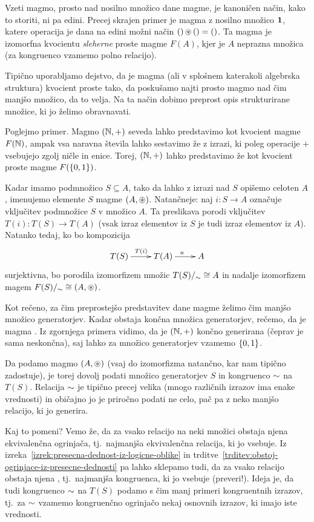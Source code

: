 Vzeti magmo, prosto nad nosilno množico dane magme, je kanoničen način, kako to storiti, ni pa edini. Precej skrajen primer je magma z nosilno množico $\mathtt{\mathbf{1}}$, katere operacija je dana na edini možni način $\mathord{()} \mathop{\circledast}\nolimits \mathord{()} = \mathord{()}$. Ta magma je izomorfna kvocientu \emph{sleherne} proste magme $F(A)$, kjer je $A$ neprazna množica (za kongruenco vzamemo polno relacijo).

Tipično uporabljamo dejstvo, da je magma (ali v splošnem katerakoli algebrska struktura) kvocient proste tako, da poskušamo najti prosto magmo nad čim manjšo množico, da to velja. Na ta način dobimo preprost opis strukturirane množice, ki jo želimo obravnavati.

Poglejmo primer. Magmo $(\mathbb{N}, +)$ seveda lahko predstavimo kot kvocient magme $F(\mathbb{N})$, ampak vsa naravna števila lahko sestavimo že z izrazi, ki poleg operacije $+$ vsebujejo zgolj ničle in enice. Torej, $(\mathbb{N}, +)$ lahko predstavimo že kot kvocient proste magme $F(\set{0, 1})$. 

Kadar imamo podmnožico $S \subseteq A$, tako da lahko z izrazi nad $S$ opišemo celoten $A$, imenujemo elemente $S$  magme $(A, \mathop{\circledast}\nolimits)$. Natančneje: naj $i\colon S \to A$ označuje vključitev podmnožice $S$ v množico $A$. Ta preslikava porodi vključitev $T(i)\colon T(S) \to T(A)$ (vsak izraz elementov iz $S$ je tudi izraz elementov iz $A$). Natanko tedaj, ko bo kompozicija
\[\xymatrix{
T(S) \ar[r]^{T(i)} & T(A) \ar[r]^a & A
}\]
surjektivna, bo porodila izomorfizem množic $T(S)/_\sim \cong A$ in nadalje izomorfizem magem $F(S)/_\sim \cong (A, \mathop{\circledast}\nolimits)$.

Kot rečeno, za čim preprostejšo predstavitev dane magme želimo čim manjšo množico generatorjev. Kadar obstaja končna množica generatorjev, rečemo, da je magma . Iz zgornjega primera vidimo, da je $(\mathbb{N}, +)$ končno generirana (čeprav je sama neskončna), saj lahko za množico generatorjev vzamemo $\set{0, 1}$.

Da podamo magmo $(A, \mathop{\circledast}\nolimits)$ (vsaj do izomorfizma natančno, kar nam tipično zadostuje), je torej dovolj podati množico generatorjev $S$ in kongruenco $\sim$ na $T(S)$. Relacija $\sim$ je tipično precej velika (mnogo različnih izrazov ima enake vrednosti) in običajno jo je priročno podati ne celo, pač pa z neko manjšo relacijo, ki jo generira.

Kaj to pomeni? Vemo že, da za vsako relacijo na neki množici obstaja njena ekvivalenčna ogrinjača, tj.~najmanjša ekvivalenčna relacija, ki jo vsebuje. Iz izreka~\ref{izrek:presecna-dednost-iz-logicne-oblike} in trditve~\ref{trditev:obstoj-ogrinjace-iz-presecne-dednosti} pa lahko sklepamo tudi, da za vsako relacijo obstaja njena , tj.~najmanjša kongruenca, ki jo vsebuje (preveri!). Ideja je, da tudi kongruenco $\sim$ na $T(S)$ podamo s čim manj primeri kongruentnih izrazov, tj.~za $\sim$ vzamemo kongruenčno ogrinjačo nekaj osnovnih izrazov, ki imajo iste vrednosti.

